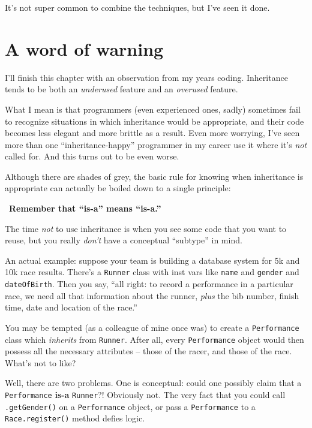It's not super common to combine the techniques, but I've seen it done.

\section{A word of warning}

I'll finish this chapter with an observation from my years coding. Inheritance
tends to be both an \textit{underused} feature and an \textit{overused}
feature.

What I mean is that programmers (even experienced ones, sadly) sometimes fail
to recognize situations in which inheritance would be appropriate, and their
code becomes less elegant and more brittle as a result. Even more worrying,
I've seen more than one ``inheritance-happy'' programmer in my career use it
where it's \textit{not} called for. And this turns out to be even worse.

Although there are shades of grey, the basic rule for knowing when inheritance
is appropriate can actually be boiled down to a single principle:

\begin{center}
{\large \HandRight} \ \textbf{Remember that ``is-a'' means ``is-a.''} \ {\large \HandLeft}
\end{center}

The time \textit{not} to use inheritance is when you see some code that you
want to reuse, but you really \textit{don't} have a conceptual ``subtype'' in
mind.

An actual example: suppose your team is building a database system for 5k and
10k race results. There's a \texttt{Runner} class with inst vars like
\texttt{name} and \texttt{gender} and \texttt{dateOfBirth}. Then you say,
``all right: to record a performance in a particular race, we need all that
information about the runner, \textit{plus} the bib number, finish time, date
and location of the race.''

You may be tempted (as a colleague of mine once was) to create a
\texttt{Performance} class which \textit{inherits} from \texttt{Runner}. After
all, every \texttt{Performance} object would then possess all the necessary
attributes -- those of the racer, and those of the race. What's not to like?

Well, there are two problems. One is conceptual: could one possibly claim that
a \texttt{Performance} \textbf{is-a} \texttt{Runner}?! Obviously not. The very
fact that you could call \texttt{.getGender()} on a \texttt{Performance}
object, or pass a \texttt{Performance} to a \texttt{Race.register()}
method defies logic.

